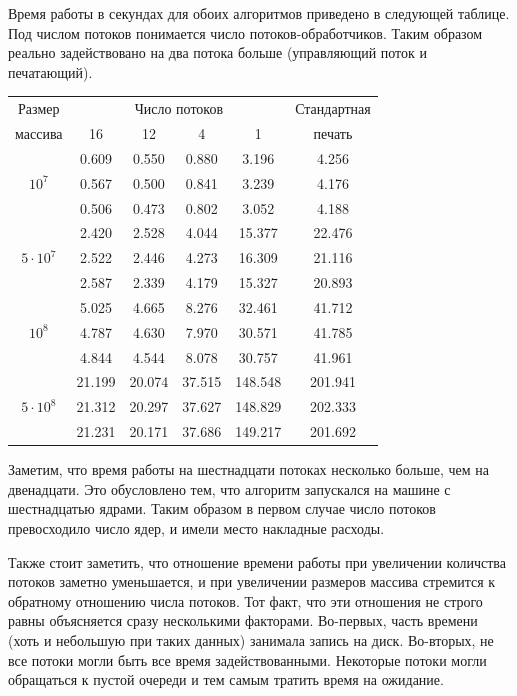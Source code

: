 \documentclass[specialist,subf,href,colorlinks=true,14pt
,times,mtpro,specialist
]{disser}
\begin{document}
Время работы в секундах для обоих алгоритмов приведено в следующей таблице.
Под числом потоков понимается число потоков-обработчиков. 
Таким образом реально задействовано на два потока больше (управляющий поток и печатающий).
\begin{center}
\begin{tabular}{||c|c|c|c|c|c||}
\hline
\hline
Размер & \multicolumn{4}{c|}{Число потоков} & Стандартная\\
\hhline{~|-|-|-|-|~|}
массива & 16 & 12 & 4 & 1 & печать \\
\hline
\hline
& 0.609 & 0.550 & 0.880 & 3.196 & 4.256 \\
\hhline{~|-|-|-|-|-|}
$10^7$ & 0.567 & 0.500 & 0.841 & 3.239 & 4.176 \\
\hhline{~|-|-|-|-|-|}
& 0.506 &0.473 & 0.802 & 3.052 & 4.188 \\
\hline
& 2.420 & 2.528 & 4.044 & 15.377 & 22.476 \\
\hhline{~|-|-|-|-|-|}
$5 \cdot 10^7$  & 2.522 & 2.446 & 4.273 & 16.309 & 21.116\\
\hhline{~|-|-|-|-|-|}
& 2.587 & 2.339 & 4.179 & 15.327 & 20.893 \\
\hline
& 5.025 & 4.665 & 8.276 & 32.461 & 41.712 \\
\hhline{~|-|-|-|-|-|}
$10^8$  & 4.787 & 4.630 & 7.970 & 30.571 & 41.785 \\
\hhline{~|-|-|-|-|-|}
& 4.844 & 4.544 & 8.078 & 30.757 & 41.961 \\
\hline
& 21.199 & 20.074 & 37.515 & 148.548 & 201.941 \\
\hhline{~|-|-|-|-|-|}
$5 \cdot 10^8$  & 21.312 & 20.297 & 37.627 & 148.829 & 202.333 \\
\hhline{~|-|-|-|-|-|}
 & 21.231 & 20.171 & 37.686 & 149.217 & 201.692 \\
\hline
\hline
\end{tabular}
\end{center}
Заметим, что время работы на шестнадцати потоках несколько больше, чем на двенадцати. 
Это обусловлено тем, что алгоритм запускался на машине с шестнадцатью ядрами.
Таким образом в первом случае число потоков превосходило число ядер, и имели место накладные расходы.

Также стоит заметить, что отношение времени работы при увеличении количства потоков заметно уменьшается, и при увеличении размеров массива стремится к обратному отношению числа потоков.
Тот факт, что эти отношения не строго равны объясняется сразу несколькими факторами.
Во-первых, часть времени (хоть и небольшую при таких данных) занимала запись на диск.
Во-вторых, не все потоки могли быть все время задействованными.
Некоторые потоки могли обращаться к пустой очереди и тем самым тратить время на ожидание.
\end{document}
